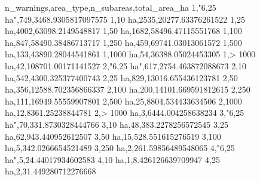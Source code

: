 n_warnings,area_type,n_subareas,total_area_ha
1,"6,25 ha",749,3468.9305817097575
1,10 ha,2535,20277.63376261522
1,25 ha,4002,63098.2149548817
1,50 ha,1682,58496.47115551768
1,100 ha,847,58490.38486713717
1,250 ha,459,69741.03013061572
1,500 ha,133,43890.28044541861
1,1000 ha,54,36388.05024453305
1,> 1000 ha,42,108701.00171141527
2,"6,25 ha",617,2754.463872088673
2,10 ha,542,4300.325377400743
2,25 ha,829,13016.655436123781
2,50 ha,356,12588.702356866337
2,100 ha,200,14101.669591812615
2,250 ha,111,16949.55559907801
2,500 ha,25,8804.534433634506
2,1000 ha,12,8361.25238844781
2,> 1000 ha,3,6444.004258638234
3,"6,25 ha",70,331.8730328444766
3,10 ha,48,383.2278256572545
3,25 ha,62,943.440952612507
3,50 ha,15,528.551615276519
3,100 ha,5,342.0266654521489
3,250 ha,2,261.59856489548065
4,"6,25 ha",5,24.44017934602583
4,10 ha,1,8.426126639709947
4,25 ha,2,31.449280712276668

